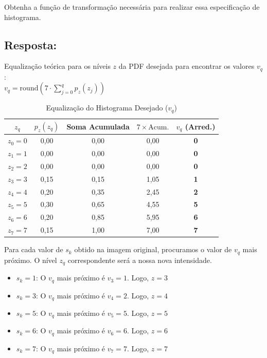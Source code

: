 \documentclass[a4paper,12pt]{article}
\begin{document}
Obtenha a função de transformação necessária para realizar essa especificação de histograma.

\subsection*{Resposta:}

\bigskip
\setcounter{table}{0}

Equalização teórica para os níveis $z$ da PDF desejada para encontrar os valores $v_q$:\\

$v_q = \text{round}\left( 7 \cdot \sum_{j=0}^{q} p_z(z_j) \right)$\\

\begin{table}[h]
	\centering
	\caption{Equalização do Histograma Desejado ($v_q$)}
	\begin{tabular}{|c|c|c|c|c|}
		\hline
		$z_q$ & $p_z(z_q)$ & Soma Acumulada & $7 \times \text{Acum.}$ & $v_q$ (Arred.) \\ \hline
		$z_0=0$ & 0,00 & 0,00 & 0,00 & \textbf{0} \\ \hline
		$z_1=1$ & 0,00 & 0,00 & 0,00 & \textbf{0} \\ \hline
		$z_2=2$ & 0,00 & 0,00 & 0,00 & \textbf{0} \\ \hline
		$z_3=3$ & 0,15 & 0,15 & 1,05 & \textbf{1} \\ \hline
		$z_4=4$ & 0,20 & 0,35 & 2,45 & \textbf{2} \\ \hline
		$z_5=5$ & 0,30 & 0,65 & 4,55 & \textbf{5} \\ \hline
		$z_6=6$ & 0,20 & 0,85 & 5,95 & \textbf{6} \\ \hline
		$z_7=7$ & 0,15 & 1,00 & 7,00 & \textbf{7} \\ \hline
	\end{tabular}
\end{table}

\newpage

Para cada valor de $s_k$ obtido na imagem original, procuramos o valor de $v_q$ mais próximo. O nível $z_q$ correspondente será a nossa nova intensidade.

\begin{itemize}
	\item $s_k=1$: O $v_q$ mais próximo é $v_3=1$. Logo, $z=3$
	\item $s_k=3$: O $v_q$ mais próximo é $v_4=2$. Logo, $z=4$
	\item $s_k=5$: O $v_q$ mais próximo é $v_5=5$. Logo, $z=5$
	\item $s_k=6$: O $v_q$ mais próximo é $v_6=6$. Logo, $z=6$
	\item $s_k=7$: O $v_q$ mais próximo é $v_7=7$. Logo, $z=7$
\end{itemize}
\end{document}
